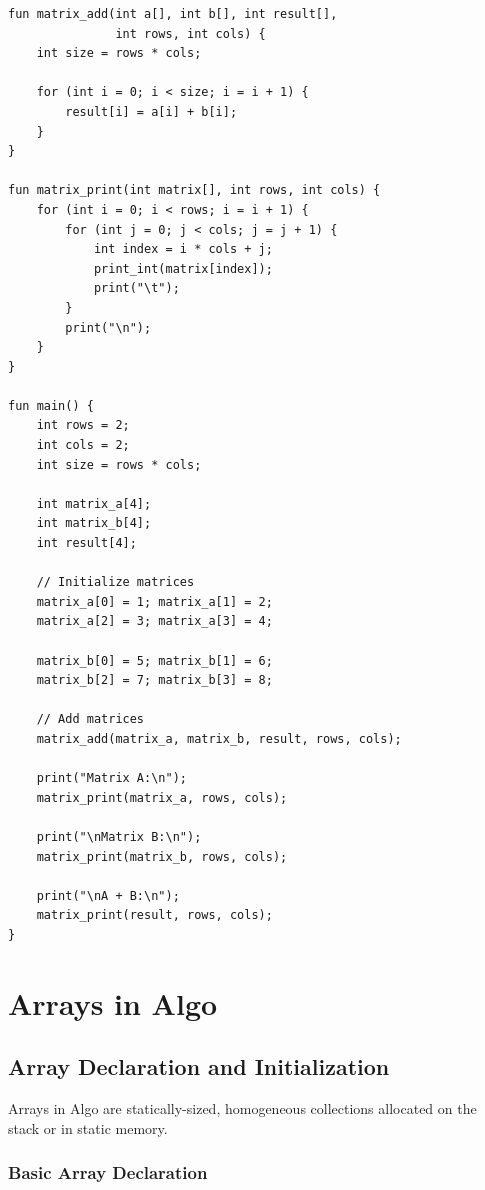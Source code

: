 \documentclass[12pt,a4paper,oneside]{book}
\begin{document}
\begin{lstlisting}[style=algo, caption={Matrix Addition}]
fun matrix_add(int a[], int b[], int result[], 
               int rows, int cols) {
    int size = rows * cols;
    
    for (int i = 0; i < size; i = i + 1) {
        result[i] = a[i] + b[i];
    }
}

fun matrix_print(int matrix[], int rows, int cols) {
    for (int i = 0; i < rows; i = i + 1) {
        for (int j = 0; j < cols; j = j + 1) {
            int index = i * cols + j;
            print_int(matrix[index]);
            print("\t");
        }
        print("\n");
    }
}

fun main() {
    int rows = 2;
    int cols = 2;
    int size = rows * cols;
    
    int matrix_a[4];
    int matrix_b[4];
    int result[4];
    
    // Initialize matrices
    matrix_a[0] = 1; matrix_a[1] = 2;
    matrix_a[2] = 3; matrix_a[3] = 4;
    
    matrix_b[0] = 5; matrix_b[1] = 6;
    matrix_b[2] = 7; matrix_b[3] = 8;
    
    // Add matrices
    matrix_add(matrix_a, matrix_b, result, rows, cols);
    
    print("Matrix A:\n");
    matrix_print(matrix_a, rows, cols);
    
    print("\nMatrix B:\n");
    matrix_print(matrix_b, rows, cols);
    
    print("\nA + B:\n");
    matrix_print(result, rows, cols);
}
\end{lstlisting}

\chapter{Arrays in Algo}

\section{Array Declaration and Initialization}

Arrays in Algo are statically-sized, homogeneous collections allocated on the stack or in static memory.

\subsection{Basic Array Declaration}
\end{document}
